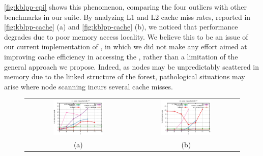 \vspace{2em}
\noindent\myfigure\ref{fig:kblpp-cpi} shows this phenomenon, comparing the four outliers with other benchmarks in our suite. By analyzing L1 and L2 cache miss rates, reported in \myfigure\ref{fig:kblpp-cache} (a) and \myfigure\ref{fig:kblpp-cache} (b), we noticed that performance degrades due to poor memory access locality. We believe this to be an issue of our current implementation of \kblpp, in which we did not make any effort aimed at improving cache efficiency in accessing the \ksf, rather than a limitation of the general approach we propose. Indeed, as nodes may be unpredictably scattered in memory due to the linked structure of the forest, pathological situations may arise where node scanning incurs several cache misses.

\ifdefined\noauthorea
\begin{figure}[!ht]
\begin{center}
\begin{tabular}{cc}
\hspace{-6mm}
\includegraphics[width=0.49\textwidth]{figures/kblpp-cache/kblpp-cache-L1.eps} &
\includegraphics[width=0.49\textwidth]{figures/kblpp-cache/kblpp-cache-L2.eps}\\
(a) & (b)
\end{tabular}
\caption{\protect}
\end{center}
\end{figure}
\fi


